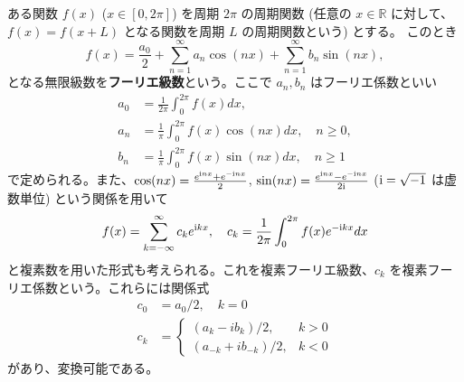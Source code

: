
%

ある関数 $f(x)$ ($x\in[0,2\pi]$) を周期 $2\pi$ の周期関数 (任意の $x\in\mathbb{R}$ に対して、$f(x)=f(x+L)$ となる関数を周期 $L$ の周期関数という) とする。
このとき
$$
	f(x)=\frac{a_0}{2}+\sum_{n=1}^{\infty}a_n\cos(nx)+\sum_{n=1}^{\infty}b_n\sin(nx),
$$
となる無限級数を\textbf{フーリエ級数}という。ここで $a_n , b_n$ はフーリエ係数といい
\begin{align*}
a_0&=\frac{1}{2\pi}\int_0^{2\pi}f(x)dx,\\
a_n&=\frac{1}{\pi}\int_0^{2\pi}f(x)\cos(nx)dx,\quad n\ge 0,\\
b_n&=\frac{1}{\pi}\int_0^{2\pi}f(x)\sin(nx)dx,\quad n\ge 1
\end{align*}
で定められる。また、$\cos(nx) = \frac{e^{\mathrm{i} nx} + e^{-\mathrm{i} nx}}2$, $\sin(nx)=\frac{e^{\mathrm{i} nx} - e^{-\mathrm{i} nx}}{2\mathrm{i}}$ ($\mathrm{i} = \sqrt{-1}$ は虚数単位) という関係を用いて
$$
	f(x)=\sum_{k=-\infty}^{\infty}c_k e^{\mathrm{i} k x},\quad c_k=\frac{1}{2\pi}\int_0^{2\pi}f(x)e^{-\mathrm{i} k x}dx
$$
と複素数を用いた形式も考えられる。これを複素フーリエ級数、$c_k$ を複素フーリエ係数という。これらには関係式
$$
\begin{aligned}
c_{0} &=a_{0}/2, \quad k=0 \\
c_{k} &= \begin{cases}\left(a_{k}-i b_{k}\right) / 2, & k>0 \\
\left(a_{-k}+i b_{-k}\right) / 2, & k<0\end{cases}
\end{aligned}$$
があり、変換可能である。

